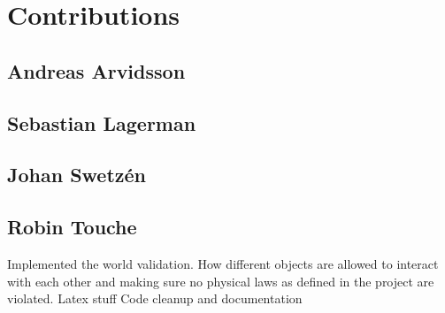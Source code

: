 \section*{Contributions}
\subsection*{Andreas Arvidsson}
\subsection*{Sebastian Lagerman}
\subsection*{Johan Swetz\'en}
\subsection*{Robin Touche}
Implemented the world validation.
How different objects are allowed to interact with each other and making sure no physical laws as defined in the project are violated.
Latex stuff
Code cleanup and documentation
